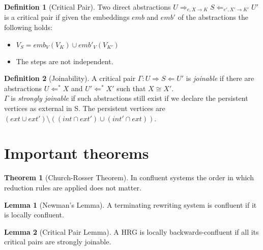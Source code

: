 \documentclass[12pt]{article}
\theoremstyle{definition}
\newtheorem{theorem}{Theorem}
\newtheorem{lemma}{Lemma}
\newtheorem{definition}{Definition}
\begin{document}
\begin{definition}[Critical Pair]
Two direct abstractions $U \Rightarrow_{e, X \rightarrow K} S \Leftarrow_{e', X' \rightarrow K'} U'$ is a critical pair if given the embeddings $emb$ and $emb'$ of the abstractions the following holds:
\begin{itemize}
\item $V_S = emb_V(V_K) \cup emb'_V(V_{K'})$
\item The steps are not independent.
\end{itemize}
\end{definition}

\begin{definition}[Joinability]
A critical pair $\Gamma: U \Rightarrow S \Leftarrow U'$ is \emph{joinable} if there are abstractions $U \Leftarrow^* X$ and $U' \Leftarrow^* X'$ such that $X \cong X'$. \\
$\Gamma$ is \emph{strongly joinable} if such abstractions still exist if we declare the persistent vertices as external in S. The persistent vertices are $(ext \cup ext') \setminus ((int \cap ext') \cup (int' \cap ext))$.
\end{definition}

\section{Important theorems}

\begin{theorem}[Church-Rosser Theorem]
In confluent systems the order in which reduction rules are applied does not matter.
\end{theorem}

\begin{lemma}[Newman's Lemma]
A terminating rewriting system is confluent if it is locally confluent.
\end{lemma}

\begin{lemma}[Critical Pair Lemma]
A HRG is locally backwards-confluent if all its critical pairs are strongly joinable.
\end{lemma}
\end{document}
